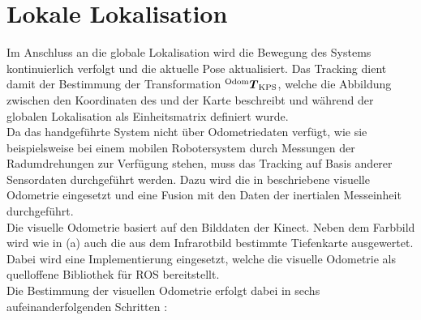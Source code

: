 \prever{
}

\section{Lokale Lokalisation}
\label{locloc}
Im Anschluss an die globale Lokalisation wird die Bewegung des Systems kontinuierlich verfolgt und die aktuelle Pose aktualisiert. Das Tracking dient damit der Bestimmung der Transformation ${^{\mathrm{Odom}}\mbox{\boldmath{$T$}}_{\mathrm{KPS}}}$, welche die Abbildung zwischen den Koordinaten des  und der Karte beschreibt und während der globalen Lokalisation als Einheitsmatrix definiert wurde.\\

Da das handgeführte System nicht über Odometriedaten verfügt, wie sie beispielsweise bei einem mobilen Robotersystem durch Messungen der Radumdrehungen zur Verfügung stehen, muss das Tracking auf Basis anderer Sensordaten durchgeführt werden. Dazu wird die in  beschriebene visuelle Odometrie eingesetzt und eine Fusion mit den Daten der inertialen Messeinheit durchgeführt.\\

Die visuelle Odometrie basiert auf den Bilddaten der Kinect. Neben dem Farbbild wird wie in  (a) auch die aus dem Infrarotbild bestimmte Tiefenkarte ausgewertet. Dabei wird eine Implementierung \cite{Fovis} eingesetzt, welche die visuelle Odometrie als quelloffene Bibliothek für ROS bereitstellt.\\
Die Bestimmung der visuellen Odometrie erfolgt dabei in sechs aufeinanderfolgenden Schritten \cite{Huang2011}:

